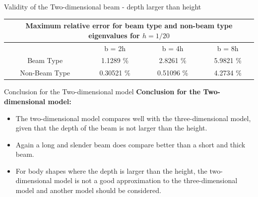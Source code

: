 \documentclass[8pt]{beamer}
\begin{document}
        \begin{frame}{Validity of the Two-dimensional beam - depth larger than height}
            \begin{table}[htbp]
                \centering
                \begin{tabular}{|c|ccc|}
                    \hline
                    \multicolumn{4}{|c|}{Maximum relative error for beam type and non-beam type eigenvalues for $h = 1/20$} \\
                    \hline
                    \hline
                    & {b = 2h} & {b = 4h} & {b = 8h} \\
                    \hline
                    Beam Type & 1.1289 \% & 2.8261 \% & 5.9821 \% \\
                    Non-Beam Type & 0.30521 \% & 0.51096 \% & 4.2734 \% \\
                    \hline
                \end{tabular}%
                \label{tab:b>h-split_20}%
            \end{table}%
        \end{frame}

        \begin{frame}{Conclusion for the Two-dimensional model}
            \textbf{Conclusion for the Two-dimensional model:}
            \begin{itemize}
                \item The two-dimensional model compares well with the three-dimensional model, given that the depth of the beam is not larger than the height.
                \item Again a long and slender beam does compare better than a short and thick beam.
                \item For body shapes where the depth is larger than the height, the two-dimensional model is not a good approximation to the three-dimensional model and another model should be considered.
            \end{itemize}
        \end{frame}
\end{document}
